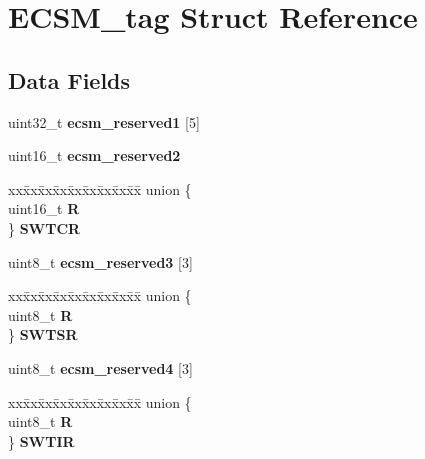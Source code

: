 \hypertarget{structECSM__tag}{}\section{E\+C\+S\+M\+\_\+tag Struct Reference}
\label{structECSM__tag}
\subsection*{Data Fields}
\begin{DoxyCompactItemize}
\item 
\mbox{\label{structECSM__tag_ab6f90bde8b52e586e1604ac959e34869}} 
uint32\+\_\+t {\bfseries ecsm\+\_\+reserved1} \mbox{[}5\mbox{]}
\item 
\mbox{\label{structECSM__tag_afa38f638ec4cbf93d17ecbec4b6fffb8}} 
uint16\+\_\+t {\bfseries ecsm\+\_\+reserved2}
\item 
\mbox{\label{structECSM__tag_a91fb5f21812e21cd7f128cd115dde7b1}} 
\begin{tabbing}
xx\=xx\=xx\=xx\=xx\=xx\=xx\=xx\=xx\=\kill
union \{\\
\>uint16\_t {\bfseries R}\\
\} {\bfseries SWTCR}\\

\end{tabbing}\item 
\mbox{\label{structECSM__tag_a45b0193e9593580f091243b24034418e}} 
uint8\+\_\+t {\bfseries ecsm\+\_\+reserved3} \mbox{[}3\mbox{]}
\item 
\mbox{\label{structECSM__tag_af0d1adbd2dcdc0857f63c108f24c1597}} 
\begin{tabbing}
xx\=xx\=xx\=xx\=xx\=xx\=xx\=xx\=xx\=\kill
union \{\\
\>uint8\_t {\bfseries R}\\
\} {\bfseries SWTSR}\\

\end{tabbing}\item 
\mbox{\label{structECSM__tag_aa07e1c2f11172d440169d1faffaacfbf}} 
uint8\+\_\+t {\bfseries ecsm\+\_\+reserved4} \mbox{[}3\mbox{]}
\item 
\mbox{\label{structECSM__tag_a56eab34540a6f81bf5d59f691740acde}} 
\begin{tabbing}
xx\=xx\=xx\=xx\=xx\=xx\=xx\=xx\=xx\=\kill
union \{\\
\>uint8\_t {\bfseries R}\\
\} {\bfseries SWTIR}\\


\end{tabbing}
\end{DoxyCompactItemize}

